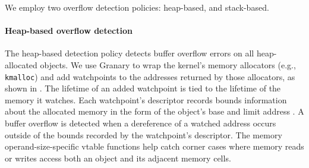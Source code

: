 \documentclass[letterpaper,twocolumn,10pt]{article}
\begin{document}
We employ two overflow detection policies: heap-based, and stack-based. %


\paragraph{Heap-based overflow detection\label{sec:heap_overflow}}
The heap-based detection policy detects buffer overflow errors on all heap-allocated objects. We use Granary to wrap the kernel's memory allocators (e.g., \texttt{kmalloc}) and add watchpoints to the addresses returned by those allocators, as shown in . The lifetime of an added watchpoint is tied to the lifetime of the memory it watches. Each watchpoint's descriptor records bounds information about the allocated memory in the form of the object's base and limit address \cite{BccFatPointers}. A buffer overflow is detected when a dereference of a watched address occurs outside of the bounds recorded by the watchpoint's descriptor. %
The memory operand-size-specific vtable functions help catch corner cases where memory reads or writes access both an object and its adjacent memory cells.%

\end{document}

